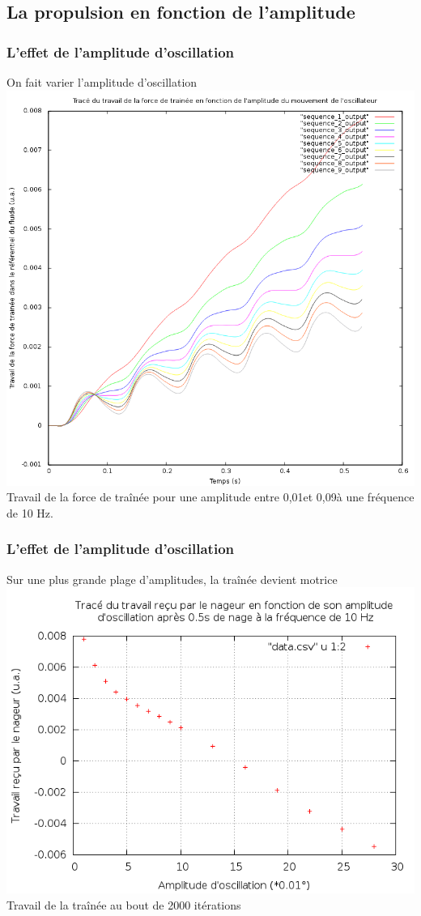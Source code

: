 \documentclass{beamer}
\begin{document}
 \subsection{La propulsion en fonction de l'amplitude}
 		
 \begin{frame}
   \frametitle{L'effet de l'amplitude d'oscillation}
   On fait varier l'amplitude d'oscillation
   \centering \includegraphics[height= 0.6 \textheight]{9courbes.png}\\
   Travail de la force de traînée pour une amplitude entre 0,01\degre et 0,09\degre à une fréquence de 10 Hz.
 \end{frame}
 	
 \begin{frame}
   \frametitle{L'effet de l'amplitude d'oscillation}
   Sur une plus grande plage d'amplitudes, la traînée devient motrice
   \centering \includegraphics[width= 0.8 \linewidth]{bcp_points.png}\\
   Travail de la traînée au bout de 2000 itérations
 \end{frame}
  
\end{document}
